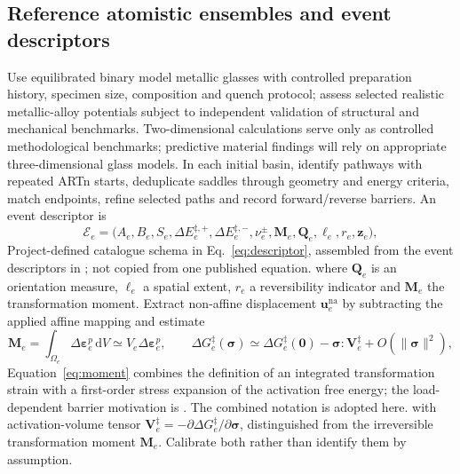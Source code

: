 \documentclass[11pt,a4paper]{article}
\newcommand{\dd}{\mathrm{d}}\newcommand{\avg}[1]{\left\langle #1\right\rangle}\newcommand{\Grad}{\operatorname{Grad}}
\begin{document}
\subsection{Reference atomistic ensembles and event descriptors}
Use equilibrated binary model metallic glasses with controlled preparation history, specimen size, composition and quench protocol; assess selected realistic metallic-alloy potentials subject to independent validation of structural and mechanical benchmarks. Two-dimensional calculations serve only as controlled methodological benchmarks; predictive material findings will rely on appropriate three-dimensional glass models. In each initial basin, identify pathways with repeated ARTn starts, deduplicate saddles through geometry and energy criteria, match endpoints, refine selected paths and record forward/reverse barriers. An event descriptor is
\begin{equation}
 \mathcal E_e=\big( A_e,B_e,S_e,\Delta E_e^{\ddagger,+},\Delta E_e^{\ddagger,-},
 \nu_e^\pm,\mathbf M_e,\mathbf Q_e,\ell_e,r_e,\mathbf z_e\big),\label{eq:descriptor}
\end{equation}
Project-defined catalogue schema in Eq.~\eqref{eq:descriptor}, assembled from the event descriptors in \cite{mousseau2012,sway2014,sway2016}; not copied from one published equation.
where $\mathbf Q_e$ is an orientation measure, $\ell_e$ a spatial extent, $r_e$ a reversibility indicator and $\mathbf M_e$ the transformation moment. Extract non-affine displacement $\mathbf u_e^\mathrm{na}$ by subtracting the applied affine mapping and estimate
\begin{equation}
 \mathbf M_e=\int_{\Omega_e}\Delta\bm\varepsilon_e^p\,\dd V
 \simeq V_e\Delta\bm\varepsilon_e^p,\qquad
 \Delta G_e^\ddagger(\bm\sigma)\simeq\Delta G_e^\ddagger(\mathbf0)
 -\bm\sigma:\mathbf V_e^\ddagger+O(\|\bm\sigma\|^2),\label{eq:moment}
\end{equation}
Equation~\eqref{eq:moment} combines the definition of an integrated transformation strain with a first-order stress expansion of the activation free energy; the load-dependent barrier motivation is \cite{sway2016}. The combined notation is adopted here.
with activation-volume tensor $\mathbf V_e^\ddagger=-\partial\Delta G_e^\ddagger/\partial\bm\sigma$, distinguished from the irreversible transformation moment $\mathbf M_e$. Calibrate both rather than identify them by assumption.
\end{document}
